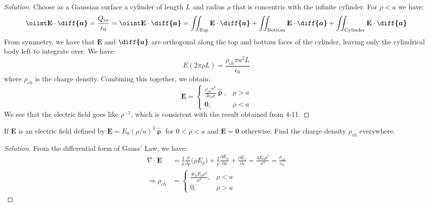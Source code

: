 \documentclass[crop=false,class=article,oneside]{standalone}
\begin{document}
    \begin{proof}[Solution]
        Choose as a Gaussian surface a cylinder of length
        $L$ and radius $\rho$ that is concentric with the
        infinite cylinder. For $\rho<a$ we have:
        \begin{equation*}
            \oiint\mathbf{E}\cdot\boldsymbol{\diff{a}}
            =\frac{Q_{in}}{\epsilon_{0}}
            =\oiint\mathbf{E}\cdot\boldsymbol{\diff{a}}
            =\iint_{\textrm{Top}}
            \mathbf{E}\cdot\boldsymbol{\diff{a}}
            +\iint_{\textrm{Bottom}}
            \mathbf{E}\cdot\boldsymbol{\diff{a}}
            +\iint_{\textrm{Cylinder}}
            \mathbf{E}\cdot\boldsymbol{\diff{a}}
        \end{equation*}
        From symmetry, we have that $\mathbf{E}$ and
        $\boldsymbol{\diff{a}}$ are orthogonal along the
        top and bottom faces of the cylinder, leaving only
        the cylindrical body left to integrate over. We have:
        \begin{equation*}
            E(2\pi\rho{L})
            =\frac{\rho_{ch}\pi{a}^{2}L}{\epsilon_{0}}
        \end{equation*}
        where $\rho_{ch}$ is the charge density.
        Combining this together, we obtain:
        \begin{equation*}
            \mathbf{E}=
            \begin{cases}
                \frac{\rho_{ch}a^{2}}{2\epsilon_{0}\rho}
                \hat{\boldsymbol{\uprho}},
                &\rho>a\\
                \mathbf{0},&\rho<a
            \end{cases}
        \end{equation*}
        We see that the electric field goes like $\rho^{-1}$,
        which is consistent with the result obtained from 4-11.
    \end{proof}
    \begin{problem}[Wangsness 4-11]
        If $\mathbf{E}$ is an electric field defined by
        $\mathbf{E}=E_{0}(\rho/a)^{3}\hat{\boldsymbol{\uprho}}$
        for $0<\rho<a$ and $\mathbf{E}=\mathbf{0}$ otherwise.
        Find the charge density $\rho_{ch}$ everywhere.
    \end{problem}
    \begin{proof}[Solution]
        From the differential form of Gauss' Law, we have:
        \begin{align*}
            \nabla\cdot\mathbf{E}
            &=\frac{1}{\rho}\frac{\partial}{\partial\rho}
            \big(\rho{E}_{\rho}\big)
            +\frac{1}{\rho}
            \frac{\partial{E_{\phi}}}{\partial\phi}
            +\frac{\partial{E_{z}}}{\partial{z}}
            =\frac{4E_{0}\rho^{2}}{a^{3}}
            =\frac{\rho_{ch}}{\epsilon_{0}}\\
            \Rightarrow\rho_{ch}
            &=
            \begin{cases}
                \frac{4\epsilon_{0}E_{0}\rho^{2}}{a^{3}},
                &\rho<a\\
                0,
                &\rho>a
            \end{cases}
        \end{align*}
    \end{proof}
\end{document}
